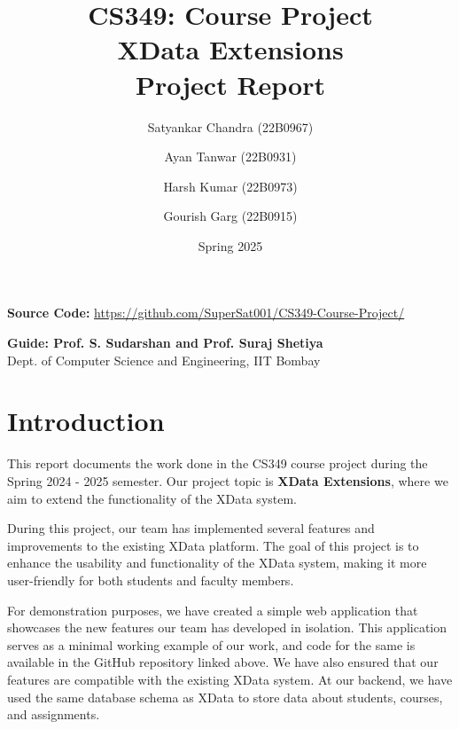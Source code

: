\documentclass[11pt]{article}
\begin{document}
\title{CS349: Course Project \\ \vspace{0.5em} \Huge \textbf{XData Extensions} \\ \vspace{0.5em} \Large Project Report}
\date{Spring 2025} %
\author{Satyankar Chandra (22B0967) \and Ayan Tanwar (22B0931) \and Harsh Kumar (22B0973) \and Gourish Garg (22B0915)} %

\maketitle
\thispagestyle{empty} %

\tableofcontents

\vfill

\begin{center}
    \Large \textbf{Source Code:} \href{https://github.com/SuperSat001/CS349-Course-Project/tree/main}{https://github.com/SuperSat001/CS349-Course-Project/}
\end{center}

\begin{center}
    \Large \textbf{Guide: Prof. S. Sudarshan and Prof. Suraj Shetiya} \\
    Dept. of Computer Science and Engineering, IIT Bombay
\end{center}
\clearpage
\pagestyle{fancy}

\newpage

\section{Introduction}

This report documents the work done in the CS349 course project during the Spring 2024 - 2025 semester. Our project topic is \textbf{XData Extensions}, where we aim to extend the functionality of the XData system. 

\medskip

During this project, our team has implemented several features and improvements to the existing XData platform. The goal of this project is to enhance the usability and functionality of the XData system, making it more user-friendly for both students and faculty members.

\medskip

For demonstration purposes, we have created a simple web application that showcases the new features our team has developed in isolation. This application serves as a minimal working example of our work, and code for the same is available in the GitHub repository linked above. We have also ensured that our features are compatible with the existing XData system. At our backend, we have used the same database schema as XData to store data about students, courses, and assignments.
\end{document}
